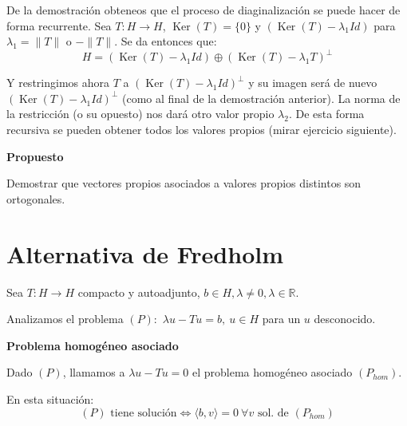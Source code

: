 \documentclass[openany]{book}
\begin{document}
De la demostración obteneos que el proceso de diaginalización se puede hacer de forma recurrente. Sea $ T: H \to H$, $ \operatorname{Ker}(T) = \{0\}  $ y $ (\operatorname{Ker}(T)- \lambda_1 Id)$ para $ \lambda_1    =  \|T\|$ o $ -\|T\|$. Se da entonces que:
$$ H = (\operatorname{Ker}(T)- \lambda_1 Id) \oplus (\operatorname{Ker}(T)-\lambda_1 T)^{\perp} $$

Y restringimos ahora $ T$ a $ (\operatorname{Ker}(T)-\lambda_1 Id )^{\perp}$ y su imagen será de nuevo $ (\operatorname{Ker}(T)-\lambda_1 Id )^{\perp}$ (como al final de la demostración anterior). La norma de la restricción (o su opuesto) nos dará otro valor propio $ \lambda_2 $. De esta forma recursiva se pueden obtener todos los valores propios (mirar ejercicio siguiente).

\begin{exercise}
    \textbf{Propuesto}

    Demostrar que vectores propios asociados a valores propios distintos son ortogonales.
\end{exercise}

\section{Alternativa de Fredholm}

    Sea $ T: H \to H$ compacto y autoadjunto, $ b \in H, \lambda  \ne 0, \lambda  \in \mathbb{R}$.

    Analizamos el problema $ (P):$ $ \lambda  u -Tu = b,\ u \in H$  para un $ u$ desconocido.

\begin{definition}
    \textbf{Problema homogéneo asociado}

    Dado $ (P)$, llamamos a $ \lambda u-Tu = 0$ el problema homogéneo asociado $ (P_{hom})$.
\end{definition}


\begin{theorem}
    En esta situación:
    $$ (P) \text{ tiene solución} \iff \langle b, v \rangle = 0 \ \forall v \text{ sol. de }(P_{hom})$$
\end{theorem}
\end{document}
